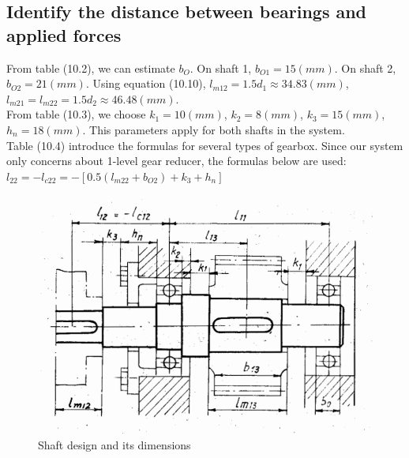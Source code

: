 \subsection{Identify the distance between bearings and applied forces}
From table (10.2), we can estimate $ b_O $. On shaft 1, $ b_{O1} = 15\unit{(mm)} $. On shaft 2, $ b_{O2} = 21\unit{(mm)} $. Using equation (10.10), $ l_{m12} = 1.5d_1 \approx  34.83\unit{(mm)} $, $ l_{m21} = l_{m22} = 1.5d_2 \approx 46.48\unit{(mm)} $.\\
From table (10.3), we choose $ k_1=10\unit{(mm)}$, $ k_2=8\unit{(mm)} $, $ k_3=15\unit{(mm)} $, $ h_n=18\unit{(mm)} $. This parameters apply for both shafts in the system.\\
Table (10.4) introduce the formulas for several types of gearbox. Since our system only concerns about 1-level gear reducer, the formulas below are used:\\
$ l_{22} = -l_{c22} = -\left[ 0.5(l_{m22}+b_{O2})+k_3+h_n \right]  $
\begin{figure}[ht]
	\centering
	\includegraphics[width=120mm]{shaft1.png}
	\caption{Shaft design and its dimensions}
\end{figure}

